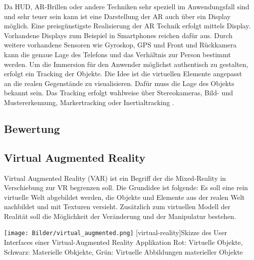 \documentclass[12pt,a4paper,bibliography=totocnumbered,listof=totocnumbered]{scrartcl}
\begin{document}
Da HUD, AR-Brillen oder andere Techniken sehr speziell im Anwendungsfall sind und sehr teuer sein kann ist eine Darstellung der AR auch über ein Display möglich. Eine preisgünstigste Realisierung der AR Technik erfolgt mittels Display. Vorhandene Displays zum Beispiel in Smartphones reichen dafür aus. Durch weitere vorhandene Sensoren wie Gyroskop, GPS und Front und Rückkamera kann die genaue Lage des Telefons und das Verhältnis zur Person bestimmt werden.\newline
Um die Immersion für den Anwender möglichst authentisch zu gestalten, erfolgt ein Tracking der Objekte. Die Idee ist die virtuellen Elemente angepasst an die realen Gegenstände zu visualisieren. Dafür muss die Lage des Objekts bekannt sein. Das Tracking erfolgt wahlweise über Stereokameras, Bild- und Mustererkennung, Markertracking oder Inertialtracking \cite{Tonnis:2010aa}.
\subsection{Bewertung}
\subsection{Virtual Augmented Reality}
Virtual Augmented Reality (\ac{VAR}) ist ein Begriff der die Mixed-Reality in Verschiebung zur VR begrenzen soll. Die Grundidee ist folgende: Es soll eine rein virtuelle Welt abgebildet werden, die Objekte und Elemente aus der realen Welt nachbildet und mit Texturen versieht. Zusätzlich zum virtuellen Modell der Realität soll die Möglichkeit der Veränderung und der Manipulatur bestehen.

\begin{minipage}{\linewidth}
\vspace{1em}
	\centering
	\texttt{[image: Bilder/virtual\_augmented.png]}
	[virtual-reality]{Skizze des User Interfaces einer Virtual-Augmented Reality Applikation\newline
	Rot: Virtuelle Objekte, Schwarz: Materielle Obkjekte, Grün: Virtuelle Abbildungen materieller Objekte}
	\label{fig:virtual_augmented_reality}
\vspace{1em}
\end{minipage}
\end{document}
